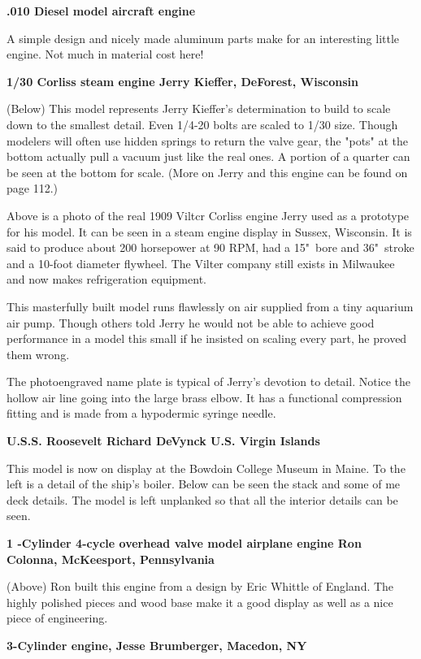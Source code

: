 \bigskip
\textbf{.010 Diesel model aircraft engine}

A simple design and nicely made aluminum parts make for an interesting little
engine. Not much in material cost here!

\bigskip
\textbf{1/30 Corliss steam engine Jerry Kieffer, DeForest, Wisconsin}

(Below) This model represents Jerry Kieffer's determination to build to scale
down to the smallest detail. Even 1/4-20 bolts are scaled to 1/30 size. Though
modelers will often use hidden springs to return the valve gear, the "pots" at
the bottom actually pull a vacuum just like the real ones. A portion of a
quarter can be seen at the bottom for scale. (More on Jerry and this engine can
be found on page 112.)

\bigskip
Above is a photo of the real 1909 Viltcr Corliss engine Jerry used as a
prototype for his model. It can be seen in a steam engine display in Sussex,
Wisconsin. It is said to produce about 200 horsepower at 90 RPM, had a 15"\ bore
and 36"\ stroke and a 10-foot diameter flywheel. The Vilter company still exists
in Milwaukee and now makes refrigeration equipment.

\bigskip
This masterfully built model runs flawlessly on air supplied from a tiny
aquarium air pump. Though others told Jerry he would not be able to achieve good
performance in a model this small if he insisted on scaling every part, he
proved them wrong.

\bigskip
The photoengraved name plate is typical of Jerry's devotion to detail. Notice
the hollow air line going into the large brass elbow. It has a functional
compression fitting and is made from a hypodermic syringe needle.

\bigskip
\textbf{U.S.S. Roosevelt Richard DeVynck U.S. Virgin Islands}

This model is now on display at the Bowdoin College Museum in Maine. To the left
is a detail of the ship's boiler. Below can be seen the stack and some of me
deck details. The model is left unplanked so that all the interior details can
be seen.

\bigskip
\textbf{1 -Cylinder 4-cycle overhead valve model airplane engine Ron 
Colonna, McKeesport, Pennsylvania}

(Above) Ron built this engine from a design by Eric Whittle of England. The
highly polished pieces and wood base make it a good display as well as a nice
piece of engineering.

\bigskip
\textbf{3-Cylinder engine, Jesse Brumberger, Macedon, NY}

